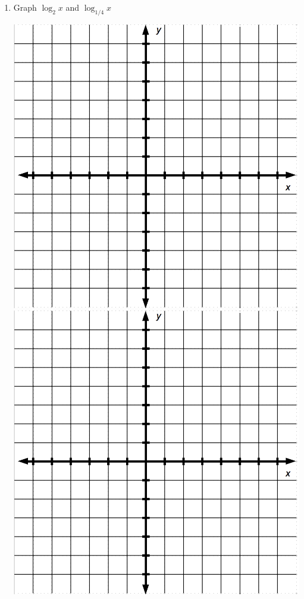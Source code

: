 \begin{enumerate}
\item Graph $\log_2 x$ and $\log_{1/4} x$\\
\begin{center}
\includegraphics[scale=.4]{bigaxes}
\includegraphics[scale=.4]{bigaxes}\vfill
\end{center}

\end{enumerate}

